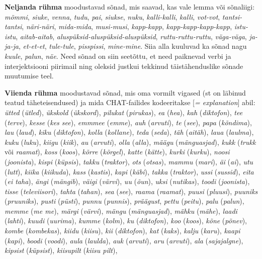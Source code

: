 \documentclass[12pt]{article}
\begin{document}
\textbf{Neljanda rühma} moodustavad sõnad, mis saavad, kas vale lemma või sõnaliigi: 
\emph{mõmmi}, \emph{siuke}, \emph{venna}, \emph{tudu}, \emph{pai}, \emph{siukse}, \emph{nuku}, \emph{kalli-kalli}, \emph{kalli}, \emph{vot-vot}, \emph{tantsi-tantsi}, \emph{näri-näri}, \emph{mida-mida}, \emph{musi-musi}, \emph{kapp-kapp}, \emph{kapp-kapp-kapp-kapp}, \emph{istu-istu}, \emph{aitab-aitab}, \emph{aluspüksid-aluspüksid-aluspüksid}, \emph{ruttu-ruttu-ruttu}, \emph{väga-väga}, \emph{ja-ja-ja}, \emph{et-et-et}, \emph{tule-tule}, \emph{pisspissi}, \emph{mine-mine}. Siia alla kuuluvad ka sõnad nagu \emph{kuule}, \emph{palun}, \emph{näe}. Need sõnad on siin seetõttu, et need paiknevad verbi ja interjektsiooni piirimail ning oleksid justkui tekkinud täistähenduslike sõnade muutumise teel. 

\textbf{Viienda rühma} moodustavad sõnad, mis oma vormilt vigased (st on läbinud teatud täheteisendused) ja mida CHAT-failides kodeeritakse [\emph{= explanation}] abil: \emph{ütted} (\emph{ütled}), \emph{ükskold} (\emph{ükskord}), \emph{pilukat} (\emph{pirukas}), \emph{ea} (\emph{hea}), \emph{kah} (\emph{diktofon}), \emph{tee} (\emph{terve}), \emph{kesse} (\emph{kes see}), \emph{emmmee} (\emph{emme}), \emph{auh} (\emph{arvuti}), \emph{te} (\emph{see}), \emph{papa} (\emph{kõndima}), \emph{lau} (\emph{laud}), \emph{kiku} (\emph{diktofon}), \emph{kolla} (\emph{kollane}), \emph{teda} (\emph{seda}), \emph{täh} (\emph{aitäh}), \emph{laua} (\emph{laulma}), \emph{kuku} (\emph{luku}), \emph{kiigu} (\emph{kiik}), \emph{au} (\emph{arvuti}), \emph{olla} (\emph{alla}), \emph{määgu} (\emph{mänguasjad}), \emph{kukk} (\emph{trukk} või \emph{raamat}), \emph{koss} (\emph{koos}), \emph{kõrre} (\emph{kõrgel}), \emph{katte} (\emph{kätte}), \emph{kurki} (\emph{kurku}), \emph{noosi} (\emph{joonista}), \emph{kispi} (\emph{küpsis}), \emph{takku} (\emph{traktor}), \emph{ots} (\emph{otsas}), \emph{mammu} (\emph{mari}), \emph{äi} (\emph{ai}), \emph{utu} (\emph{lutt}), \emph{kiika} (\emph{kiikuda}), \emph{kass} (\emph{kastis}), \emph{kapi} (\emph{käbi}), \emph{takka} (\emph{traktor}), \emph{ussi} (\emph{sussid}), \emph{eita} (\emph{ei taha}), \emph{ängi} (\emph{mängib}), \emph{väigi} (\emph{värvi}), \emph{uu} (\emph{õun}), \emph{uksi} (\emph{nutikas}), \emph{toodi} (\emph{joonista}), \emph{tisse} (\emph{televiisori}), \emph{tahta} (\emph{tahan}), \emph{sea} (\emph{see}), \emph{raama} (\emph{raamat}), \emph{puusi} (\emph{pluusi}), \emph{puuniks} (\emph{pruuniks}), \emph{pusti} (\emph{püsti}), \emph{punnu} (\emph{punnis}), \emph{präägust}, \emph{pettu} (\emph{peitu}), \emph{palu} (\emph{palun}), \emph{memme} (\emph{me me}), \emph{märgi} (\emph{värvi}), \emph{mängu} (\emph{mänguasjad}), \emph{mähku} (\emph{mähe}), \emph{laadi} (\emph{lahti}), \emph{kuudi} (\emph{uurima}), \emph{kumme} (\emph{kolm}), \emph{ku} (\emph{diktofon}), \emph{koo} (\emph{koos}), \emph{kõne} (\emph{põnev}), \emph{kombe} (\emph{kombekas}), \emph{kiidu} (\emph{kiisu}), \emph{kii} (\emph{diktofon}), \emph{kat} (\emph{kaks}), \emph{kalju} (\emph{karu}), \emph{kaapi} (\emph{kapi}), \emph{boodi} (\emph{voodi}), \emph{aula} (\emph{laulda}), \emph{auk} (\emph{arvuti}), \emph{aru} (\emph{arvuti}), \emph{ala} (\emph{sajajalgne}), \emph{kipsist} (\emph{küpsist}), \emph{kiisupilt} (\emph{kiisu pilt}), 
\end{document}
